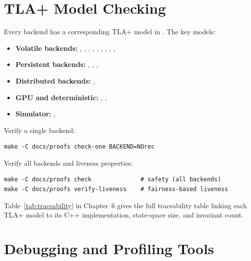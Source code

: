 \section{TLA+ Model Checking}
\label{sec:repo-tla}

Every backend has a corresponding TLA+ model in
.  The key models:

\begin{itemize}
    \item \textbf{Volatile backends:} , ,
          , ,
          , , ,
          , , 
    \item \textbf{Persistent backends:} ,
          , , 
    \item \textbf{Distributed backends:} ,
    \item \textbf{GPU and deterministic:} ,
          , 
    \item \textbf{Simulator:} , 
\end{itemize}

Verify a single backend:

\begin{verbatim}
make -C docs/proofs check-one BACKEND=NOrec
\end{verbatim}

Verify all backends and liveness properties:

\begin{verbatim}
make -C docs/proofs check              # safety (all backends)
make -C docs/proofs verify-liveness    # fairness-based liveness
\end{verbatim}

Table~\ref{tab:traceability} in Chapter~6 gives the full traceability table linking each
TLA+ model to its C++ implementation, state-space size, and invariant
count.

\section{Debugging and Profiling Tools}
\label{sec:repo-tools}

